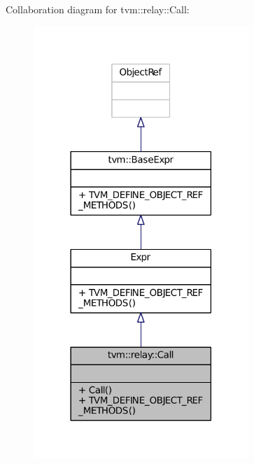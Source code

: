 Collaboration diagram for tvm\+:\+:relay\+:\+:Call\+:
\nopagebreak
\begin{figure}[H]
\begin{center}
\leavevmode
\includegraphics[width=230pt]{classtvm_1_1relay_1_1Call__coll__graph}
\end{center}
\end{figure}
